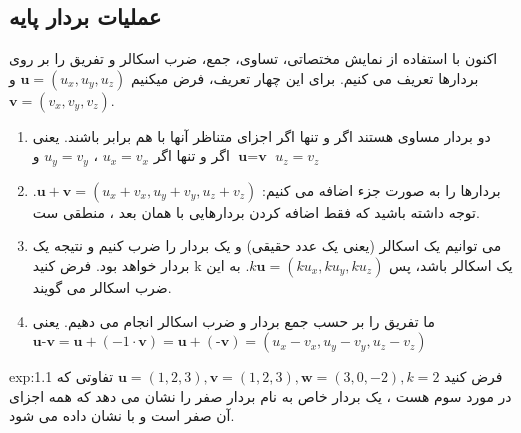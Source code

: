\subsection{\textbf{عملیات بردار پایه}}
{
    \Large
    \begin{spacing}{1.5}
        اکنون با استفاده از نمایش مختصاتی، تساوی، جمع، ضرب اسکالر و تفریق را بر روی بردارها تعریف می کنیم.
        برای این چهار تعریف، فرض میکنیم $\textbf{u}=(u_{x},u_{y},u_{z})$ و  $\textbf{v}=(v_{x},v_{y},v_{z})$.

        \begin{enumerate}[label=\textbf{\arabic*}.]
            \item {دو بردار مساوی هستند اگر و تنها اگر اجزای متناظر آنها با هم برابر باشند.
            یعنی $\textbf{u}=\textbf{v}$ اگر و تنها اگر $u_{x}=v_{x}$ ، $u_{y}=v_{y}$ و $u_{z}=v_{z}$}
            \item {بردارها را به صورت جزء اضافه می کنیم: $\textbf{u}+\textbf{v}=(u_{x}+v_{x},u_{y}+v_{y},u_{z}+v_{z})$.
            توجه داشته باشید که فقط اضافه کردن بردارهایی با همان بعد ، منطقی ست.}
            \item {می توانیم یک اسکالر (یعنی یک عدد حقیقی) و یک بردار را ضرب کنیم و نتیجه یک بردار خواهد بود.
            فرض کنید k یک اسکالر باشد، پس $k\textbf{u}=(ku_{x},ku_{y},ku_{z})$. به این ضرب اسکالر می گویند.}
            \item {ما تفریق را بر حسب جمع بردار و ضرب اسکالر انجام می دهیم.
            یعنی\\$\textbf{u}\textbf{-v}=\textbf{u}+(-1\cdot\textbf{v})=\textbf{u}+(\textbf{-v})=(u_{x}-v_{x},u_{y}-v_{y},u_{z}-v_{z})$}
        \end{enumerate}

        \textbf{\vspace{-10pt}}
        \begin{example}{exp:1.1}
            \Large
            فرض کنید $\textbf{u}=(1,2,3), \textbf{v}=(1,2,3), \textbf{w}=(3,0,-2), k=2$
            تفاوتی که در مورد سوم هست ، یک بردار خاص به نام بردار صفر را نشان می دهد که همه اجزای آن صفر است و با  نشان داده می شود.
        \end{example}


\end{spacing}}
